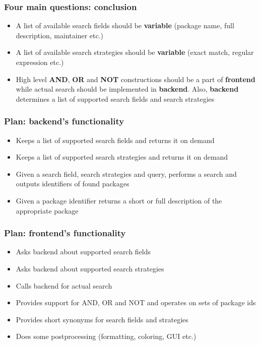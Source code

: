 \documentclass[hyperref=unicode,ascii,xcolor=dvipsnames]{beamer}
\begin{document}

\begin{frame}[fragile]
  \frametitle{Four main questions: conclusion}
  \begin{itemize}
  \item A list of available search fields should be {\bf variable} (package
    name, full description, maintainer etc.)
  \item A list of available search strategies should be {\bf variable}
    (exact match, regular expression etc.)
  \item High level {\bf AND}, {\bf OR} and {\bf NOT} constructions
    should be a part of {\bf frontend} while actual search should be
    implemented in {\bf backend}. Also, {\bf backend} determines a list of
    supported search fields and search strategies
  \end{itemize}
\end{frame}


\begin{frame}[fragile]
  \frametitle{Plan: backend's functionality}
  \begin{itemize}
  \item Keeps a list of supported search fields and returns it on demand
  \item Keeps a list of supported search strategies and returns it on demand
  \item Given a search field, search strategies and query, performs a
    search and outputs identifiers of found packages
  \item Given a package identifier returns a short or full description
    of the appropriate package
  \end{itemize}
\end{frame}


\begin{frame}[fragile]
  \frametitle{Plan: frontend's functionality}
  \begin{itemize}
  \item Asks backend about supported search fields
  \item Asks backend about supported search strategies
  \item Calls backend for actual search
  \item Provides support for AND, OR and NOT and operates on sets of package ids
  \item Provides short synonyms for search fields and strategies
  \item Does some postprocessing (formatting, coloring, GUI etc.)
  \end{itemize}
\end{frame}
\end{document}
